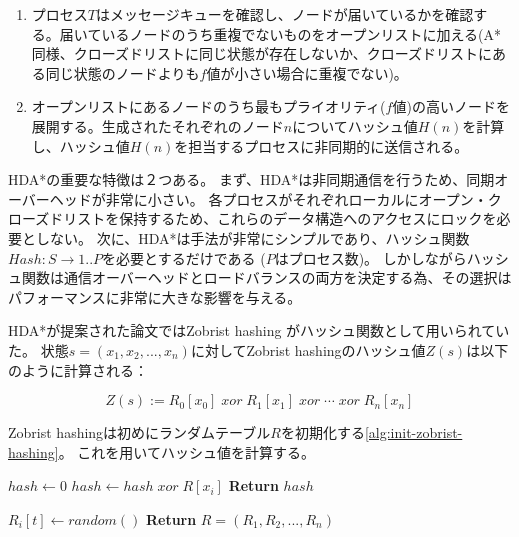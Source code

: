 \documentclass[10pt]{book}
\newcommand{\ZHDA}{ZHDA*}
\begin{document}
\begin{enumerate}
	\item 
		プロセス$T$はメッセージキューを確認し、ノードが届いているかを確認する。届いているノードのうち重複でないものをオープンリストに加える(A*同様、クローズドリストに同じ状態が存在しないか、クローズドリストにある同じ状態のノードよりも$f$値が小さい場合に重複でない)。
	\item 
		オープンリストにあるノードのうち最もプライオリティ($f$値)の高いノードを展開する。生成されたそれぞれのノード$n$についてハッシュ値$H(n)$を計算し、ハッシュ値$H(n)$を担当するプロセスに非同期的に送信される。
\end{enumerate}

HDA*の重要な特徴は２つある。
まず、HDA*は非同期通信を行うため、同期オーバーヘッドが非常に小さい。
各プロセスがそれぞれローカルにオープン・クローズドリストを保持するため、これらのデータ構造へのアクセスにロックを必要としない。
次に、HDA*は手法が非常にシンプルであり、ハッシュ関数$Hash: S \rightarrow {1..P}$を必要とするだけである ($P$はプロセス数)。
しかしながらハッシュ関数は通信オーバーヘッドとロードバランスの両方を決定する為、その選択はパフォーマンスに非常に大きな影響を与える。


HDA*が提案された論文\cite{kishimotofb13}ではZobrist hashing \cite{zobrist:70}がハッシュ関数として用いられていた。
状態$s = (x_1,x_2,...,x_n)$に対してZobrist hashingのハッシュ値$Z(s)$は以下のように計算される：

\begin{equation}
\label{eq:zobrist}
 	Z(s) := R_{0}[x_{0}]\; xor\; R_{1}[x_{1}]\; xor\; \cdots\; xor\; R_{n}[x_{n}]%
\end{equation}

Zobrist hashingは初めにランダムテーブル$R$を初期化する\ref{alg:init-zobrist-hashing}。
これを用いてハッシュ値を計算する。

\begin{algorithm}
	$hash \leftarrow 0$\;
	 {
		$hash \leftarrow hash \; xor \; R[x_i]$\;
	}
	{\bf Return} $hash$\;
	\caption{\ZHDA{}}
	\label{alg:zobrist-hashing}
\end{algorithm}

\begin{algorithm}
	 {
		 {
			$R_i[t] \leftarrow random()$\;
		}
	}
	{\bf Return} $R = (R_1, R_2,...,R_n)$
	\caption{Initialize \ZHDA{}}
	\label{alg:init-zobrist-hashing}
\end{algorithm}
\end{document}
